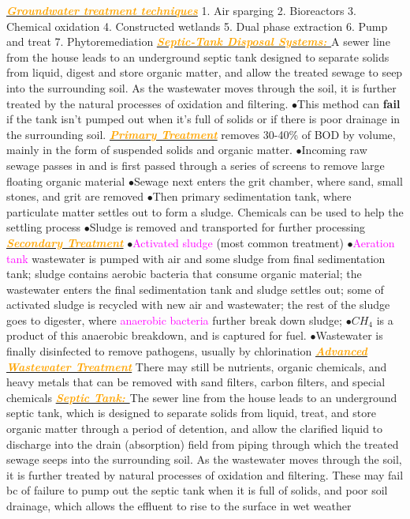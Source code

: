 \documentclass{article}
\newcommand{\ddd}{$\bullet$}
\newcommand{\pink}[1]{\textcolor{magenta}{#1}}
\newcommand{\orange}[1]{\textcolor{orange}{#1}}
\newcommand{\mysubsection}[1]{\underline{\textbf{{\textit{\orange{#1}}}}}}
\newcommand{\vocab}[1]{{\pink{#1}}}
\begin{document}
\begin{multicols*}{4}
        \mysubsection{Groundwater treatment techniques}
             1. Air sparging 2. Bioreactors 3. Chemical oxidation 4. Constructed wetlands 5. Dual phase extraction 6. Pump and treat 7. Phytoremediation
        \mysubsection{Septic-Tank Disposal Systems: }
            A sewer line from the house leads to an underground septic tank designed to separate solids from liquid, digest and store organic matter, and allow the treated sewage to seep into the surrounding soil. As the wastewater moves through the soil, it is further treated by the natural processes of oxidation and filtering.
            \ddd This method can \textbf{fail} if the tank isn't pumped out when it's full of solids or if there is poor drainage in the surrounding soil.
        \mysubsection{Primary Treatment} 
            removes 30-40\% of BOD by volume, mainly in the form of suspended solids and organic matter. 
            \ddd Incoming raw sewage passes in and is first passed through a series of screens to remove large floating organic material
            \ddd Sewage next enters the grit chamber, where sand, small stones, and grit are removed
            \ddd Then primary sedimentation tank, where particulate matter settles out to form a sludge. Chemicals can be used to help the settling process
            \ddd Sludge is removed and transported for further processing
    	 \mysubsection{Secondary Treatment}
    	    \ddd \vocab{Activated sludge} (most common treatment)
    	    \ddd \vocab{Aeration tank} wastewater is pumped with air and some sludge from final sedimentation tank; sludge contains aerobic bacteria that consume organic material; the wastewater enters the final sedimentation tank and sludge settles out; some of activated sludge is recycled with new air and wastewater; the rest of the sludge goes to digester, where \vocab{anaerobic bacteria} further break down sludge;
    	    \ddd $CH_4$ is a product of this anaerobic breakdown, and is captured for fuel. 
    	    \ddd Wastewater is finally disinfected to remove pathogens, usually by chlorination
    	  \mysubsection{Advanced Wastewater Treatment}
    	    There may still be nutrients, organic chemicals, and heavy metals that can be removed with sand filters, carbon filters, and special chemicals        
        \mysubsection{Septic Tank: } 
        	The sewer line from the house leads to an underground septic tank, which is designed to separate solids from liquid, treat, and store organic matter through a period of detention, and allow the clarified liquid to discharge into the drain (absorption) field from piping through which the treated sewage seeps into the surrounding soil. As the wastewater moves through the soil, it is further treated by natural processes of oxidation and filtering. These may fail bc of failure to pump out the septic tank when it is full of solids, and poor soil drainage, which allows the effluent to rise to the surface in wet weather

\end{multicols*}
\end{document}
